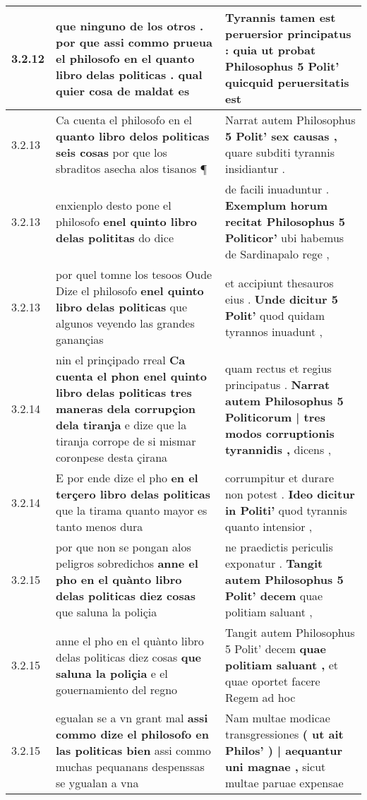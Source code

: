\begin{tabular}{|p{1cm}|p{6.5cm}|p{6.5cm}|}
3.2.12 & que ninguno de los otros . \textbf{ por que assi commo prueua el philosofo en el quanto libro delas politicas . } qual quier cosa de maldat es & Tyrannis tamen est peruersior principatus : \textbf{ quia ut probat Philosophus 5 Polit’ } quicquid peruersitatis est \\\hline
3.2.13 & Ca cuenta el philosofo en el \textbf{ quanto libro delos politicas seis cosas } por que los sbraditos asecha alos tisanos ¶ & Narrat autem Philosophus \textbf{ 5 Polit’ sex causas , } quare subditi tyrannis insidiantur . \\\hline
3.2.13 & enxienplo desto pone el philosofo \textbf{ enel quinto libro delas polititas } do dice & de facili inuaduntur . \textbf{ Exemplum horum recitat Philosophus 5 Politicor’ } ubi habemus de Sardinapalo rege , \\\hline
3.2.13 & por quel tomne los tesoos Oude Dize el philosofo \textbf{ enel quinto libro delas politicas } que algunos veyendo las grandes ganançias & et accipiunt thesauros eius . \textbf{ Unde dicitur 5 Polit’ } quod quidam tyrannos inuadunt , \\\hline
3.2.14 & nin el prinçipado rreal \textbf{ Ca cuenta el phon enel quinto libro delas politicas tres maneras dela corrupçion dela tiranja } e dize que la tiranja corrope de si mismar coronpese desta çirana & quam rectus et regius principatus . \textbf{ Narrat autem Philosophus 5 Politicorum | tres modos corruptionis tyrannidis , } dicens , \\\hline
3.2.14 & E por ende dize el pho \textbf{ en el terçero libro delas politicas } que la tirama quanto mayor es tanto menos dura & corrumpitur et durare non potest . \textbf{ Ideo dicitur in Politi’ } quod tyrannis quanto intensior , \\\hline
3.2.15 & por que non se pongan alos peligros sobredichos \textbf{ anne el pho en el quànto libro delas politicas diez cosas } que saluna la poliçia & ne praedictis periculis exponatur . \textbf{ Tangit autem Philosophus 5 Polit’ decem } quae politiam saluant , \\\hline
3.2.15 & anne el pho en el quànto libro delas politicas diez cosas \textbf{ que saluna la poliçia } e el gouernamiento del regno & Tangit autem Philosophus 5 Polit’ decem \textbf{ quae politiam saluant , } et quae oportet facere Regem ad hoc \\\hline
3.2.15 & egualan se a vn grant mal \textbf{ assi commo dize el philosofo en las politicas bien } assi commo muchas pequanans despenssas se ygualan a vna & Nam multae modicae transgressiones \textbf{ ( ut ait Philos’ ) | aequantur uni magnae , } sicut multae paruae expensae \\\hline

\end{tabular}

